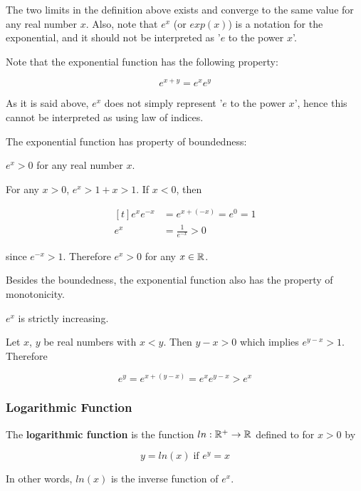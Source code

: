 \documentclass[a4paper,12pt]{article}
\begin{document}
The two limits in the definition above exists and converge to the same value for any real number $x$. Also, note that $e^{x}$ (or $exp(x)$) is a notation for the exponential, and it should not be interpreted as '$e$ to the power $x$'.\n

Note that the exponential function has the following property:

$$e^{x+y}=e^{x}e^{y}$$\s

As it is said above, $e^{x}$ does not simply represent '$e$ to the power $x$', hence this cannot be interpreted as using law of indices.\n

The exponential function has property of boundedness:\n

\begin{thm}
  $e^{x}>0$ for any real number $x$.\n

  \prf For any $x>0$, $e^{x}>1+x>1$. If $x<0$, then

  $$\begin{aligned}[t]
    e^{x}e^{-x}&=e^{x+(-x)}=e^{0}=1\\
    e^{x}&=\frac{1}{e^{-x}}>0
  \end{aligned}$$\s

  since $e^{-x}>1$. Therefore $e^{x}>0$ for any $x\in \mathbb{R}$.
\end{thm}\n

Besides the boundedness, the exponential function also has the property of monotonicity.\n

\begin{thm}
  $e^{x}$ is strictly increasing.\n

  \prf Let $x$, $y$ be real numbers with $x<y$. Then $y-x>0$ which implies $e^{y-x}>1$. Therefore

  $$e^{y}=e^{x+(y-x)}=e^{x}e^{y-x}>e^{x}$$
\end{thm}

\subsubsection{Logarithmic Function}
\begin{dft}
  The \textbf{logarithmic function} is the function $ln: \mathbb{R}^{+}\to \mathbb{R}$ defined to for $x>0$ by

  $$y=ln(x)\;\text{if }e^{y}=x$$
\end{dft}\n

In other words, $ln(x)$ is the inverse function of $e^{x}$.\n
\end{document}
